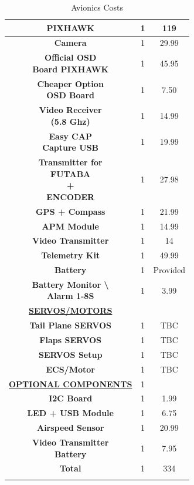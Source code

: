 \documentclass[12pt]{article}
\begin{document}
\begin{longtable}{ | c | c | c |}
    \textbf{PIXHAWK} & 1 & 119 \\ 
    \hline
    \textbf{Camera} & 1 & 29.99 \\ 
    \hline
    \makecell{\textbf{Official OSD} \\ \textbf{Board PIXHAWK}} & 1 & 45.95 \\ 
    \hline
    \makecell{\textbf{Cheaper Option} \\ \textbf{OSD Board}} & 1 & 7.50 \\ 
    \hline
    \makecell{\textbf{Video Receiver} \\ \textbf{(5.8 Ghz)}} & 1 & 14.99 \\ 
    \hline
    \makecell{\textbf{Easy CAP} \\ \textbf{Capture USB}} & 1 & 19.99 \\ 
    \hline
    \makecell{\textbf{Transmitter for} \\ \textbf{FUTABA} \\ \textbf{+} \\ \textbf{ENCODER}} & 1 & 27.98 \\ 
    \hline
    \textbf{GPS + Compass} & 1 & 21.99 \\ 
    \hline
    \textbf{APM Module} & 1 & 14.99 \\ 
    \hline
    \textbf{Video Transmitter} & 1 & 14 \\ 
    \hline 
    \textbf{Telemetry Kit} & 1 & 49.99 \\ 
    \hline
    \textbf{Battery} & 1 & Provided\\ 
    \hline
    \makecell{\textbf{Battery Monitor \textbackslash } \\ \textbf{Alarm 1-8S}} & 1 & 3.99 \\
    \hline
    \underline{\textbf{SERVOS/MOTORS}} & & \\ 
    \hline
    \textbf{Tail Plane SERVOS} & 1 &TBC\\ 
    \hline
    \textbf{Flaps SERVOS} & 1 & TBC\\ 
    \hline 
    \textbf{SERVOS Setup} & 1 & TBC\\ 
    \hline
    \textbf{ECS/Motor} & 1 & TBC\\ 
    \hline 
    \underline{\textbf{OPTIONAL COMPONENTS}} & 1 & \\ 
    \hline
    \textbf{I2C Board} & 1 & 1.99 \\ 
    \hline
    \textbf{LED + USB Module} & 1 & 6.75 \\ 
    \hline
    \textbf{Airspeed Sensor} & 1 & 20.99 \\ 
    \hline
    \makecell{\textbf{Video Transmitter} \\ \textbf{Battery}} & 1 & 7.95 \\ 
    \hline
    \textbf{Total} & 1 & 334\\ 
    \hline
    \caption{Avionics Costs}\\
\end{longtable}
\end{document}
